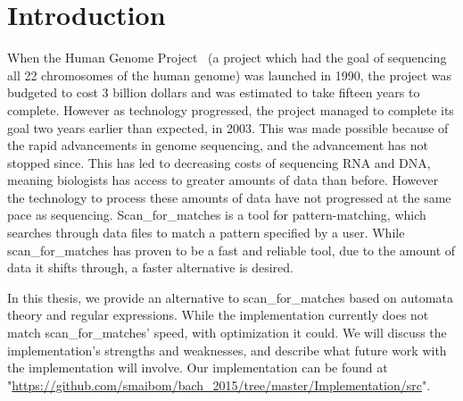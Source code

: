 \section{Introduction}%
When the Human Genome Project~\cite{hgp} (a project which had the goal of sequencing 
all 22 chromosomes of the human genome) was launched in 1990, the project was 
budgeted to cost 3 billion dollars and was estimated to take fifteen years 
to complete. However as technology progressed, the project managed to complete 
its goal two years earlier than expected, in 2003. This was made possible 
because of the rapid advancements in genome sequencing, and the advancement 
has not stopped since. This has led to decreasing costs of sequencing RNA and DNA, 
meaning biologists has access to greater amounts of data than before. 
However the technology to process these amounts of data have not progressed at 
the same pace as sequencing. Scan\_for\_matches is a tool for pattern-matching, 
which searches through data files to match a pattern specified by a user. 
While scan\_for\_matches has proven to be a fast and reliable 
tool, due to the amount of data it shifts through, a faster alternative 
is desired.

In this thesis, we provide an alternative to scan\_for\_matches based on 
automata theory and regular expressions. While the implementation currently 
does not match scan\_for\_matches' speed, with optimization it could. We will 
discuss the implementation's strengths and weaknesses, and describe what 
future work with the implementation will involve.
Our implementation can be found at 
"\url{https://github.com/smaibom/bach_2015/tree/master/Implementation/src}".
\begin{comment}
After hearing about this problem, we thought that there must be a better 
way of searching through data that is also theoretically sound. Our first 
thought was using automata-based searching methods, since this provides a 
calculable best- and worst-case run time while being theoretically sound. 
Since regular expressions uses an automata-based way of searching, we hypothesized 
that implementing regular expressions which have the same functions as 
scan\_for\_matches would lead to faster run times.
\end{comment}
